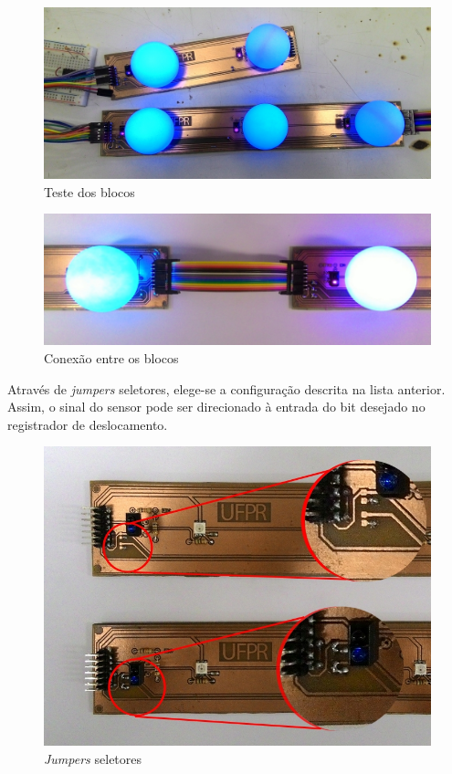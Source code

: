 \documentclass[a4paper,12pt]{article}
\begin{document}
  \begin{figure}[!ht]
    \caption{Teste dos blocos}
    \label{fig:mesa-protoboard}
    \centering
    \includegraphics[width=0.9\linewidth]{img/mesa-protoboard.jpg}
  \end{figure}  
  
  \clearpage
  
  \begin{figure}[!ht]
    \caption{Conexão entre os blocos}
    \label{fig:mesa-conexao}
    \centering
    \includegraphics[width=0.9\linewidth]{img/mesa-conexao.jpg}
  \end{figure}  
  
  Através de \emph{jumpers} seletores, elege-se a configuração descrita na lista anterior. Assim, o sinal do sensor pode ser direcionado à entrada do bit desejado no registrador de deslocamento.
   
  \begin{figure}[!h]
    \caption{\emph{Jumpers} seletores}
    \label{fig:mesa-jumpers}
    \centering
    \includegraphics[width=0.9\linewidth]{img/mesa-jumpers.jpg}
  \end{figure}    
  
\end{document}
